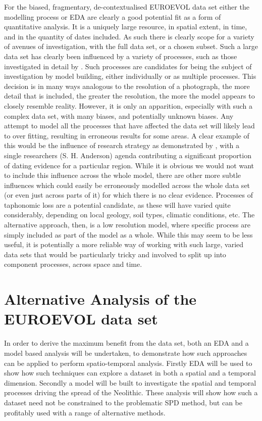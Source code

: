 For the biased, fragmentary, de-contextualised EUROEVOL data set either the modelling process or EDA are clearly a good potential fit as a form of quantitative analysis. It is a uniquely large resource, in spatial extent, in time, and in the quantity of dates included. As such there is clearly scope for a variety of avenues of investigation, with the full data set, or a chosen subset. Such a large data set has clearly been influenced by a variety of processes, such as those investigated in detail by \citet{Torfing2015193}.  Such processes are candidates for being the subject of investigation by model building, either individually or as multiple processes. This decision is in many ways analogous to the resolution of a photograph, the more detail that is included, the greater the resolution, the more the model appears to closely resemble reality. However, it is only an apparition, especially with such a complex data set, with many biases, and potentially unknown biases. Any attempt to model all the processes that have affected the data set will likely lead to over fitting, resulting in erroneous results for some areas. A clear example of this would be the influence of research strategy as demonstrated by \citet[196]{Torfing2015193}, with a single researchers (S. H. Anderson) agenda contributing a significant proportion of dating evidence for a particular region. While it is obvious we would not want to include this influence across the whole model, there are other more subtle influences which could easily be erroneously modelled across the whole data set (or even just across parts of it) for which there is no clear evidence. Processes of taphonomic loss are a potential candidate, as these will have varied quite considerably, depending on local geology, soil types, climatic conditions, etc. The alternative approach, then, is a low resolution model, where specific process are simply included as part of the model as a whole. While this may seem to be less useful, it is potentially a more reliable way of working with such large, varied data sets that would be particularly tricky and involved to split up into component processes, across space and time. 

\section{Alternative Analysis of the EUROEVOL data set}
In order to derive the maximum benefit from the data set, both an EDA and a model based analysis will be undertaken, to demonstrate how such approaches can be applied to perform spatio-temporal analysis. Firstly EDA will be used to show how such techniques can explore a dataset in both a spatial and a temporal dimension. Secondly a model will be built to investigate the spatial and temporal processes driving the spread of the Neolithic. These analysis will show how such a dataset need not be constrained to the problematic SPD method, but can be profitably used with a range of alternative methods.

